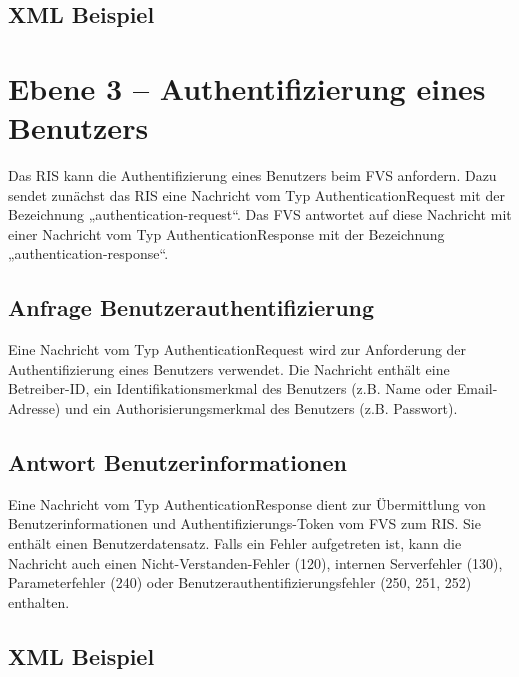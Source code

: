 

\subsection{XML Beispiel}

\section{Ebene 3 -- Authentifizierung eines Benutzers}
Das RIS kann die Authentifizierung eines Benutzers beim FVS anfordern. Dazu sendet zunächst das RIS eine Nachricht vom Typ AuthenticationRequest mit der Bezeichnung „authentication-request“. Das FVS antwortet auf diese Nachricht mit einer Nachricht vom Typ AuthenticationResponse mit der Bezeichnung „authentication-response“.



\subsection{Anfrage Benutzerauthentifizierung}
Eine Nachricht vom Typ AuthenticationRequest wird zur Anforderung der Authentifizierung eines Benutzers verwendet. Die Nachricht enthält eine Betreiber-ID, ein Identifikationsmerkmal des Benutzers (z.B. Name oder Email-Adresse) und ein Authorisierungsmerkmal des Benutzers (z.B. Passwort).



\subsection{Antwort Benutzerinformationen}
Eine Nachricht vom Typ AuthenticationResponse dient zur Übermittlung von Benutzerinformationen und Authentifizierungs-Token vom FVS zum RIS. Sie enthält einen Benutzerdatensatz. Falls ein Fehler aufgetreten ist, kann die Nachricht auch einen Nicht-Verstanden-Fehler (120), internen Serverfehler (130), Parameterfehler (240) oder Benutzerauthentifizierungsfehler (250, 251, 252) enthalten.



\subsection{XML Beispiel}

